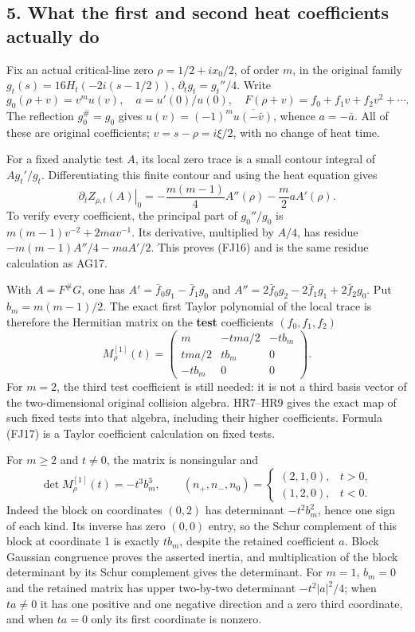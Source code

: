 \documentclass[
  10pt,
  a4paper,
]{article}
\begin{document}
\subsection{5. What the first and second heat coefficients actually
do}\label{what-the-first-and-second-heat-coefficients-actually-do}

Fix an actual critical-line zero \(\rho=1/2+ix_0/2\), of order \(m\), in
the original family \(g_t(s)=16H_t(-2i(s-1/2))\),
\(\partial_tg_t=g_t''/4\). Write \[
g_0(\rho+v)=v^m u(v),\quad a=u'(0)/u(0),\quad
F(\rho+v)=f_0+f_1v+f_2v^2+\cdots.
\tag{FJ15}
\] The reflection \(g_0^\#=g_0\) gives
\(u(v)=(-1)^m\overline{u(-\bar v)}\), whence \(a=-\bar a\). All of these
are original coefficients; \(v=s-\rho=i\xi/2\), with no change of heat
time.

For a fixed analytic test \(A\), its local zero trace is a small contour
integral of \(Ag_t'/g_t\). Differentiating this finite contour and using
the heat equation gives \[
\left.\partial_t Z_{\rho,t}(A)\right|_0
 =-\frac{m(m-1)}4 A''(\rho)-\frac m2aA'(\rho).
\tag{FJ16}
\] To verify every coefficient, the principal part of \(g_0''/g_0\) is
\(m(m-1)v^{-2}+2ma v^{-1}\). Its derivative, multiplied by \(A/4\), has
residue \(-m(m-1)A''/4-maA'/2\). This proves (FJ16) and is the same
residue calculation as AG17.

With \(A=F^\#G\), one has \(A'=\bar f_0g_1-\bar f_1g_0\) and
\(A''=2\bar f_0g_2-2\bar f_1g_1+2\bar f_2g_0\). Put \(b_m=m(m-1)/2\).
The exact first Taylor polynomial of the local trace is therefore the
Hermitian matrix on the \textbf{test} coefficients \((f_0,f_1,f_2)\) \[
M^{[1]}_\rho(t)=
\begin{pmatrix}
m&-tma/2&-tb_m\\
tma/2&tb_m&0\\
-tb_m&0&0
\end{pmatrix}.
\tag{FJ17}
\] For \(m=2\), the third test coefficient is still needed: it is not a
third basis vector of the two-dimensional original collision algebra.
HR7--HR9 gives the exact map of such fixed tests into that algebra,
including their higher coefficients. Formula (FJ17) is a Taylor
coefficient calculation on fixed tests.

For \(m\ge2\) and \(t\ne0\), the matrix is nonsingular and \[
\det M^{[1]}_\rho(t)=-t^3b_m^3,\qquad
(n_+,n_-,n_0)=
\begin{cases}(2,1,0),&t>0,\\(1,2,0),&t<0.\end{cases}
\tag{FJ18}
\] Indeed the block on coordinates \((0,2)\) has determinant
\(-t^2b_m^2\), hence one sign of each kind. Its inverse has zero
\((0,0)\) entry, so the Schur complement of this block at coordinate 1
is exactly \(tb_m\), despite the retained coefficient \(a\). Block
Gaussian congruence proves the asserted inertia, and multiplication of
the block determinant by its Schur complement gives the determinant. For
\(m=1\), \(b_m=0\) and the retained matrix has upper two-by-two
determinant \(-t^2|a|^2/4\); when \(ta\ne0\) it has one positive and one
negative direction and a zero third coordinate, and when \(ta=0\) only
its first coordinate is nonzero.
\end{document}
